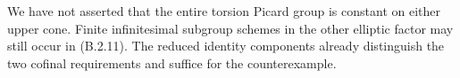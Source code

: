 \begin{remark}[Scope]
We have not asserted that the entire torsion Picard group is
constant on either upper cone.  Finite infinitesimal subgroup
schemes in the other elliptic factor may still occur in
(B.2.11).  The reduced identity components already distinguish
the two cofinal requirements and suffice for the counterexample.
\end{remark}
